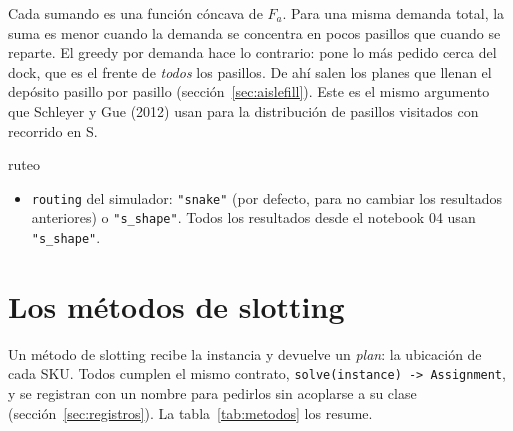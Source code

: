 \documentclass[11pt,a4paper,oneside]{report}
\newcommand{\code}[1]{\texttt{\small #1}}
\begin{document}
Cada sumando es una función cóncava de $F_a$. Para una misma demanda total, la suma es menor
cuando la demanda se concentra en pocos pasillos que cuando se reparte. El greedy por demanda
hace lo contrario: pone lo más pedido cerca del dock, que es el frente de \emph{todos} los
pasillos. De ahí salen los planes que llenan el depósito pasillo por pasillo
(sección~\ref{sec:aislefill}). Este es el mismo argumento que Schleyer y Gue (2012) usan para
la distribución de pasillos visitados con recorrido en S.

\begin{hiper}{ruteo}
\begin{itemize}
  \item \code{routing} del simulador: \code{"snake"} (por defecto, para no cambiar los
        resultados anteriores) o \code{"s\_shape"}. Todos los resultados desde el notebook 04
        usan \code{"s\_shape"}.
\end{itemize}
\end{hiper}

\chapter{Los métodos de slotting}
\label{cap:metodos}

Un método de slotting recibe la instancia y devuelve un \emph{plan}: la ubicación de cada SKU.
Todos cumplen el mismo contrato, \code{solve(instance) -> Assignment}, y se registran con un
nombre para pedirlos sin acoplarse a su clase (sección~\ref{sec:registros}). La
tabla~\ref{tab:metodos} los resume.
\end{document}
